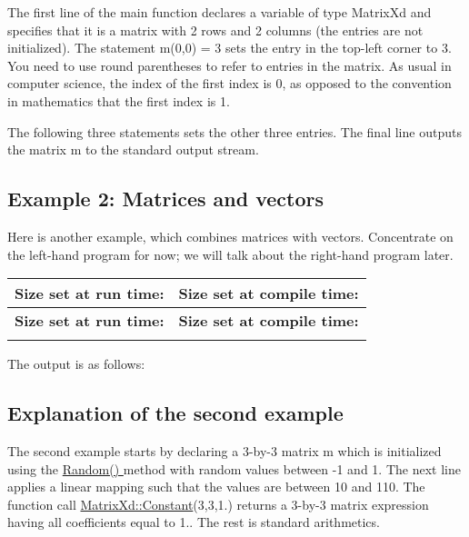 The first line of the {\ttfamily main} function declares a variable of type {\ttfamily Matrix\+Xd} and specifies that it is a matrix with 2 rows and 2 columns (the entries are not initialized). The statement {\ttfamily m(0,0) = 3} sets the entry in the top-\/left corner to 3. You need to use round parentheses to refer to entries in the matrix. As usual in computer science, the index of the first index is 0, as opposed to the convention in mathematics that the first index is 1.

The following three statements sets the other three entries. The final line outputs the matrix {\ttfamily m} to the standard output stream.\hypertarget{_getting_started_GettingStartedExample2}{}\subsection{Example 2\+: Matrices and vectors}\label{_getting_started_GettingStartedExample2}
Here is another example, which combines matrices with vectors. Concentrate on the left-\/hand program for now; we will talk about the right-\/hand program later.

\tabulinesep=1mm
\begin{longtabu} spread 0pt [c]{*{2}{|X[-1]}|}
\hline
\rowcolor{\tableheadbgcolor}\textbf{ Size set at run time\+:}&\textbf{ Size set at compile time\+: }\\
\endfirsthead
\hline
\endfoot
\hline
\rowcolor{\tableheadbgcolor}\textbf{ Size set at run time\+:}&\textbf{ Size set at compile time\+: }\\
\endhead

\begin{DoxyCodeInclude}
\end{DoxyCodeInclude}
  &
\begin{DoxyCodeInclude}
\end{DoxyCodeInclude}
 \\
\end{longtabu}


The output is as follows\+:


\begin{DoxyCodeInclude}
\end{DoxyCodeInclude}
\hypertarget{_getting_started_GettingStartedExplanation2}{}\subsection{Explanation of the second example}\label{_getting_started_GettingStartedExplanation2}
The second example starts by declaring a 3-\/by-\/3 matrix {\ttfamily m} which is initialized using the \hyperlink{group___core___module_ae97f8d9d08f969c733c8144be6225756}{Random() } method with random values between -\/1 and 1. The next line applies a linear mapping such that the values are between 10 and 110. The function call \hyperlink{group___core___module_ab0ae1bfa72faedcaf53af81ca76c446b}{Matrix\+Xd\+::\+Constant}(3,3,1.) returns a 3-\/by-\/3 matrix expression having all coefficients equal to 1.. The rest is standard arithmetics.

